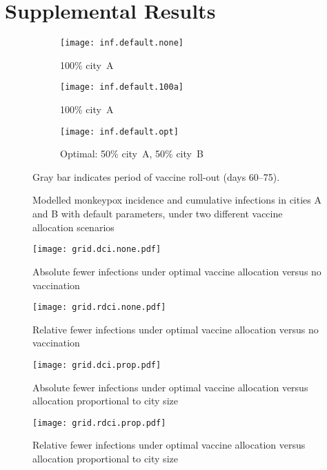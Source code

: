 \section{Supplemental Results}
\begin{figure}[h]
  \begin{subfigure}{\linewidth}
    \texttt{[image: inf.default.none]}
    \caption{100\% city~A}
    \label{fig:inf.default.none}
  \end{subfigure}
  \begin{subfigure}{\linewidth}
    \texttt{[image: inf.default.100a]}
    \caption{100\% city~A}
    \label{fig:inf.default.100a}
  \end{subfigure}
  \begin{subfigure}{\linewidth}
    \texttt{[image: inf.default.opt]}
    \caption{Optimal: 50\% city~A, 50\% city~B}
    \label{fig:inf.default.opt}
  \end{subfigure}
  \caption{Modelled monkeypox incidence and cumulative infections
    in cities A and B with default parameters,
    under two different vaccine allocation scenarios}
  \label{fig:inf.default}
  \floatfoot
  Gray bar indicates period of vaccine roll-out (days 60--75).
\end{figure}
\begin{figure}[h]
  \texttt{[image: grid.dci.none.pdf]}
  \caption{Absolute fewer infections under optimal vaccine allocation
    versus no vaccination}
  \label{fig:grid.dci.none}
  \floatfoot\gridfoot
\end{figure}
\begin{figure}[h]
  \texttt{[image: grid.rdci.none.pdf]}
  \caption{Relative fewer infections under optimal vaccine allocation
    versus no vaccination}
  \label{fig:grid.rdci.none}
  \floatfoot\gridfoot
\end{figure}
\begin{figure}[h]
  \texttt{[image: grid.dci.prop.pdf]}
  \caption{Absolute fewer infections under optimal vaccine allocation
    versus allocation proportional to city size}
  \label{fig:grid.dci.prop}
  \floatfoot\gridfoot
\end{figure}
\begin{figure}[h]
  \texttt{[image: grid.rdci.prop.pdf]}
  \caption{Relative fewer infections under optimal vaccine allocation
    versus allocation proportional to city size}
  \label{fig:grid.rdci.prop}
  \floatfoot\gridfoot
\end{figure}